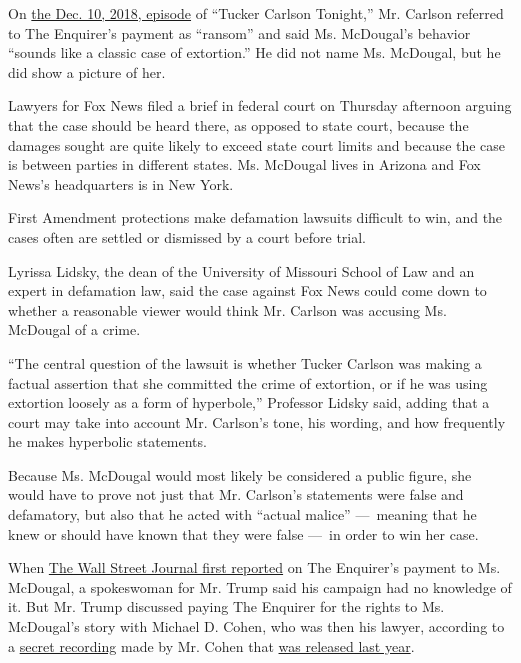 On
\href{https://www.youtube.com/watch?v=wkBwoG0urhs\&feature=youtu.be\&t=228}{the
Dec. 10, 2018, episode} of ``Tucker Carlson Tonight,'' Mr. Carlson
referred to The Enquirer's payment as ``ransom'' and said Ms. McDougal's
behavior ``sounds like a classic case of extortion.'' He did not name
Ms. McDougal, but he did show a picture of her.

Lawyers for Fox News filed a brief in federal court on Thursday
afternoon arguing that the case should be heard there, as opposed to
state court, because the damages sought are quite likely to exceed state
court limits and because the case is between parties in different
states. Ms. McDougal lives in Arizona and Fox News's headquarters is in
New York.

First Amendment protections make defamation lawsuits difficult to win,
and the cases often are settled or dismissed by a court before trial.

Lyrissa Lidsky, the dean of the University of Missouri School of Law and
an expert in defamation law, said the case against Fox News could come
down to whether a reasonable viewer would think Mr. Carlson was accusing
Ms. McDougal of a crime.

``The central question of the lawsuit is whether Tucker Carlson was
making a factual assertion that she committed the crime of extortion, or
if he was using extortion loosely as a form of hyperbole,'' Professor
Lidsky said, adding that a court may take into account Mr. Carlson's
tone, his wording, and how frequently he makes hyperbolic statements.

Because Ms. McDougal would most likely be considered a public figure,
she would have to prove not just that Mr. Carlson's statements were
false and defamatory, but also that he acted with ``actual malice''
---~meaning that he knew or should have known that they were false
---~in order to win her case.

When
\href{https://www.wsj.com/articles/national-enquirer-shielded-donald-trump-from-playboy-models-affair-allegation-1478309380}{The
Wall Street Journal first reported} on The Enquirer's payment to Ms.
McDougal, a spokeswoman for Mr. Trump said his campaign had no knowledge
of it. But Mr. Trump discussed paying The Enquirer for the rights to Ms.
McDougal's story with Michael D. Cohen, who was then his lawyer,
according to a
\href{https://www.nytimes3xbfgragh.onion/2018/07/20/us/politics/michael-cohen-trump-tape.html}{secret
recording} made by Mr. Cohen that
\href{https://www.nytimes3xbfgragh.onion/2018/07/25/us/politics/trump-michael-cohen-recording.html}{was
released last year}.

